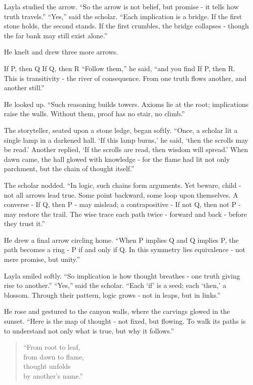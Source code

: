 \documentclass[
  letterpaper,
  DIV=11,
  numbers=noendperiod]{scrreprt}
\begin{document}
Layla studied the arrow. ``So the arrow is not belief, but promise - it
tells how truth travels.'' ``Yes,'' said the scholar. ``Each implication
is a bridge. If the first stone holds, the second stands. If the first
crumbles, the bridge collapses - though the far bank may still exist
alone.''

He knelt and drew three more arrows.

If P, then Q If Q, then R ``Follow them,'' he said, ``and you find If P,
then R. This is transitivity - the river of consequence. From one truth
flows another, and another still.''

He looked up. ``Such reasoning builds towers. Axioms lie at the root;
implications raise the walls. Without them, proof has no stair, no
climb.''

The storyteller, seated upon a stone ledge, began softly. ``Once, a
scholar lit a single lamp in a darkened hall. `If this lamp burns,' he
said, `then the scrolls may be read.' Another replied, `If the scrolls
are read, then wisdom will spread.' When dawn came, the hall glowed with
knowledge - for the flame had lit not only parchment, but the chain of
thought itself.''

The scholar nodded. ``In logic, such chains form arguments. Yet beware,
child - not all arrows lead true. Some point backward, some loop upon
themselves. A converse - If Q, then P - may mislead; a contrapositive -
If not Q, then not P - may restore the trail. The wise trace each path
twice - forward and back - before they trust it.''

He drew a final arrow circling home. ``When P implies Q and Q implies P,
the path becomes a ring - P if and only if Q. In this symmetry lies
equivalence - not mere promise, but unity.''

Layla smiled softly. ``So implication is how thought breathes - one
truth giving rise to another.'' ``Yes,'' said the scholar. ``Each `if'
is a seed; each `then,' a blossom. Through their pattern, logic grows -
not in leaps, but in links.''

He rose and gestured to the canyon walls, where the carvings glowed in
the sunset. ``Here is the map of thought - not fixed, but flowing. To
walk its paths is to understand not only what is true, but why it
follows.''

\begin{quote}
``From root to leaf,\\
from dawn to flame,\\
thought unfolds\\
by another's name.''
\end{quote}
\end{document}
